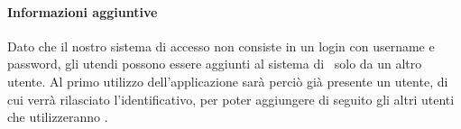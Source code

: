     \paragraph{Informazioni aggiuntive}
    Dato che il nostro sistema di accesso non consiste in un login con username e password, gli utendi possono essere aggiunti al sistema di \progetto\ solo da un altro utente. Al primo utilizzo dell'applicazione sarà perciò già presente un utente, di cui verrà rilasciato l'identificativo, per poter aggiungere di seguito gli altri utenti che utilizzeranno \progetto. 


